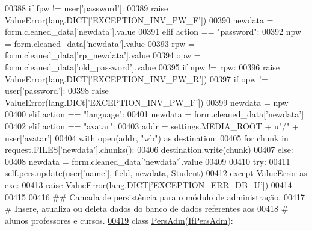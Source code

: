 \begin{DoxyCode}
00388             \textcolor{keywordflow}{if} fpw != user[\textcolor{stringliteral}{'password'}]:
00389                 \textcolor{keywordflow}{raise} ValueError(lang.DICT[\textcolor{stringliteral}{'EXCEPTION\_INV\_PW\_F'}])
00390             newdata = form.cleaned\_data[\textcolor{stringliteral}{'newdata'}].value
00391         \textcolor{keywordflow}{elif} action == \textcolor{stringliteral}{"password"}:
00392             npw = form.cleaned\_data[\textcolor{stringliteral}{'newdata'}].value
00393             rpw = form.cleaned\_data[\textcolor{stringliteral}{'rp\_newdata'}].value
00394             opw = form.cleaned\_data[\textcolor{stringliteral}{'old\_password'}].value
00395             \textcolor{keywordflow}{if} npw != rpw:
00396                 \textcolor{keywordflow}{raise} ValueError(lang.DICT[\textcolor{stringliteral}{'EXCEPTION\_INV\_PW\_R'}])
00397             \textcolor{keywordflow}{if} opw != user[\textcolor{stringliteral}{'password'}]:
00398                 \textcolor{keywordflow}{raise} ValueError(lang.DICt[\textcolor{stringliteral}{'EXCEPTION\_INV\_PW\_F'}])
00399             newdata = npw
00400         \textcolor{keywordflow}{elif} action == \textcolor{stringliteral}{"language"}:
00401             newdata = form.cleaned\_data[\textcolor{stringliteral}{'newdata'}]
00402         \textcolor{keywordflow}{elif} action == \textcolor{stringliteral}{"avatar"}:
00403             addr = settings.MEDIA\_ROOT + \textcolor{stringliteral}{u"/"} + user[\textcolor{stringliteral}{'avatar'}]
00404             with open(addr, \textcolor{stringliteral}{"wb"}) \textcolor{keyword}{as} destination:
00405                     \textcolor{keywordflow}{for} chunk \textcolor{keywordflow}{in} request.FILES[\textcolor{stringliteral}{'newdata'}].chunks():
00406                         destination.write(chunk)
00407         \textcolor{keywordflow}{else}:
00408             newdata = form.cleaned\_data[\textcolor{stringliteral}{'newdata'}].value
00409 
00410         \textcolor{keywordflow}{try}:
00411             self.pers.update(user[\textcolor{stringliteral}{'name'}], field, newdata, Student)
00412         \textcolor{keywordflow}{except} ValueError \textcolor{keyword}{as} exc:
00413             \textcolor{keywordflow}{raise} ValueError(lang.DICT[\textcolor{stringliteral}{'EXCEPTION\_ERR\_DB\_U'}])
00414 
00415 
00416 \textcolor{comment}{## Camada de persistência para o módulo de administração.}
00417 \textcolor{comment}{#   Insere, atualiza ou deleta dados do banco de dados referentes aos }
00418 \textcolor{comment}{#   alunos professores e cursos.}
\hypertarget{AdmUnit_8py_source_l00419}{}\hyperlink{classAdm_1_1AdmUnit_1_1PersAdm}{00419} \textcolor{keyword}{class }\hyperlink{classAdm_1_1AdmUnit_1_1PersAdm}{PersAdm}(\hyperlink{classAdm_1_1AdmUnit_1_1IfPersAdm}{IfPersAdm}):

\end{DoxyCode}
